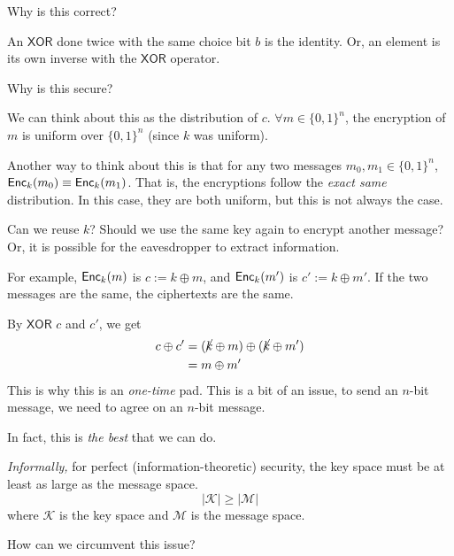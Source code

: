 \begin{ques*}
    Why is this correct?
\end{ques*}
An $\mathsf{XOR}$ done twice with the same choice bit $b$ is the identity. Or, an element is its own inverse with the $\mathsf{XOR}$ operator.

\begin{ques*}
    Why is this secure?
\end{ques*}

We can think about this as the distribution of $c$. $\forall m\in \{0, 1\}^n$, the encryption of $m$ is uniform over $\{0, 1\}^n$ (since $k$ was uniform).

Another way to think about this is that for any two messages $m_0, m_1\in\{0, 1\}^n$, $\operatorname{\mathsf{Enc}}_k(m_0)\equiv \operatorname{\mathsf{Enc}}_k(m_1)$. That is, the encryptions follow the \emph{exact same} distribution. In this case, they are both uniform, but this is not always the case.

\begin{ques*}
    Can we reuse $k$? Should we use the same key again to encrypt another message? Or, it is possible for the eavesdropper to extract information.
\end{ques*}

For example, $\operatorname{\mathsf{Enc}}_k(m)$ is $c:= k\oplus m$, and $\operatorname{\mathsf{Enc}}_k(m')$ is $c' := k\oplus m'$. If the two messages are the same, the ciphertexts are the same.

By $\mathsf{XOR}$ $c$ and $c'$, we get
\begin{align*}
    c\oplus c' & = (\cancel{k}\oplus m) \oplus (\cancel{k}\oplus m') \\
               & = m\oplus m'
\end{align*}
This is why this is an \emph{one-time} pad. This is a bit of an issue, to send an $n$-bit message, we need to agree on an $n$-bit message.

In fact, this is \emph{the best} that we can do.

\begin{theorem}
    \emph{Informally,} for perfect (information-theoretic) security, the key space must be at least as large as the message space.
    \[|\mathcal{K}|\geq |\mathcal{M}|\]
    where $\mathcal{K}$ is the key space and $\mathcal{M}$ is the message space.
\end{theorem}

\begin{ques*}
    How can we circumvent this issue?
\end{ques*}


